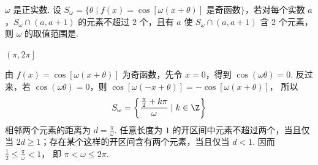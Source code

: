 \begin{problem}
\(\omega\) 是正实数. 设 \(S_{\omega} = \{\theta \mid f(x) = \cos[\omega(x + \theta)] \text{ 是奇函数}\}\)，若对每个实数 \(a\)，\(S_{\omega} \cap (a, a + 1)\) 的元素不超过 \(2\) 个，且有 \(a\) 使 \(S_{\omega} \cap (a, a + 1)\) 含 \(2\) 个元素，则 \(\omega\) 的取值范围是\fillinblank{}.

\begin{answer}
\(\left(\pi, 2\pi\right]\)
\end{answer}

\begin{solution}
由 \(f(x)=\cos[\omega(x+\theta)]\) 为奇函数，先令 \(x=0\)，得到 \(\cos(\omega\theta)=0\). 反过来，若 \(\cos(\omega\theta)=0\)，则
\(\cos[\omega(-x+\theta)]=-\cos[\omega(x+\theta)]\)，
所以
\[
S_{\omega}=\left\{\frac{\frac{\pi}{2}+k\pi}{\omega}\mid k\in\Z\right\}
\]
相邻两个元素的距离为 \(d=\frac{\pi}{\omega}\). 任意长度为 \(1\) 的开区间中元素不超过两个，当且仅当 \(2d\geqslant1\)；存在某个这样的开区间含有两个元素，当且仅当 \(d<1\). 因而
\(\frac12\leqslant\frac{\pi}{\omega}<1\)，
即 \(\pi<\omega\leqslant2\pi\).
\end{solution}
\end{problem}

